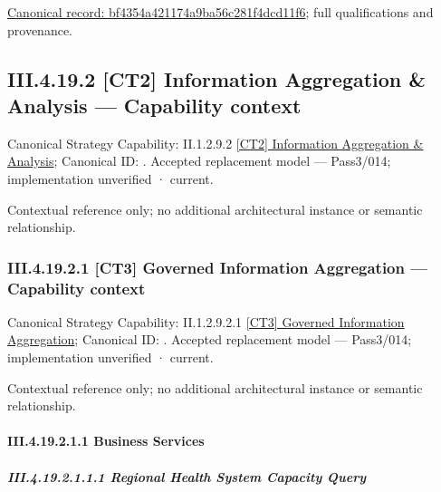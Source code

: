 {\footnotesize \href{../../../../../../../../continuum/business/business-function/bf4354a421174a9ba56c281f4dcd11f6.md}{Canonical record: bf4354a421174a9ba56c281f4dcd11f6}; full qualifications and provenance.}\par
\subsection*{III.4.19.2 [CT2] Information Aggregation \& Analysis — Capability context}
\label{navigation:III.4.19.2}

{\small Canonical Strategy Capability: II.1.2.9.2 \hyperref[element:1387ed8b07444d06a10eb60a47d5af8a]{[CT2] Information Aggregation \& Analysis}; Canonical ID: \texttt{}. Accepted replacement model — Pass3/014; implementation unverified · current.}\par
Contextual reference only; no additional architectural instance or semantic relationship.\par
\subsubsection*{III.4.19.2.1 [CT3] Governed Information Aggregation — Capability context}
\label{navigation:III.4.19.2.1}

{\small Canonical Strategy Capability: II.1.2.9.2.1 \hyperref[element:97909bca83fd4ece8d35e64243923b9d]{[CT3] Governed Information Aggregation}; Canonical ID: \texttt{}. Accepted replacement model — Pass3/014; implementation unverified · current.}\par
Contextual reference only; no additional architectural instance or semantic relationship.\par
\paragraph*{III.4.19.2.1.1 Business Services}
\label{navigation:III.4.19.2.1.1}

\subparagraph*{III.4.19.2.1.1.1 Regional Health System Capacity Query}
\label{navigation:III.4.19.2.1.1.1}


